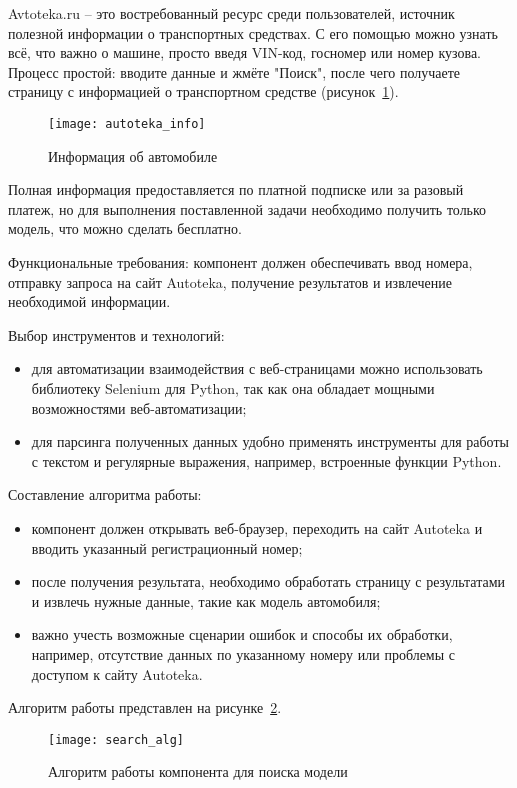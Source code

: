 Avtoteka.ru – это востребованный ресурс среди пользователей, источник полезной информации о транспортных средствах. С его помощью можно узнать всё, что важно о машине, просто введя VIN-код, госномер или номер кузова. Процесс простой: вводите данные и жмёте "Поиск", после чего получаете страницу с информацией о транспортном средстве (рисунок~\ref{f:autoteka_info}).

\begin{figure}[ht]
	\centering
	\vspace{\toppaddingoffigure}
	\texttt{[image: autoteka\_info]}
	\caption{Информация об автомобиле}
	\label{f:autoteka_info}
\end{figure}

Полная информация предоставляется по платной подписке или за разовый платеж, но для выполнения поставленной задачи необходимо получить только модель, что можно сделать бесплатно.


Функциональные требования: компонент должен обеспечивать ввод номера, отправку запроса на сайт Autoteka, получение результатов и извлечение необходимой информации.

Выбор инструментов и технологий: 
\begin{itemize}
    \item для автоматизации взаимодействия с веб-страницами можно использовать библиотеку Selenium для Python, так как она обладает мощными возможностями веб-автоматизации;
    \item для парсинга полученных данных удобно применять инструменты для работы с текстом и регулярные выражения, например, встроенные функции Python.
\end{itemize}


Составление алгоритма работы:
\begin{itemize}
    \item компонент должен открывать веб-браузер, переходить на сайт Autoteka и вводить указанный регистрационный номер;
    \item после получения результата, необходимо обработать страницу с результатами и извлечь нужные данные, такие как модель автомобиля;
    \item важно учесть возможные сценарии ошибок и способы их обработки, например, отсутствие данных по указанному номеру или проблемы с доступом к сайту Autoteka.
\end{itemize}

Алгоритм работы представлен на рисунке~\ref{f:search_alg}.

\begin{figure}[ht]
	\centering
	\vspace{\toppaddingoffigure}
	\texttt{[image: search\_alg]}
	\caption{Алгоритм работы компонента для поиска модели}
	\label{f:search_alg}
\end{figure}



